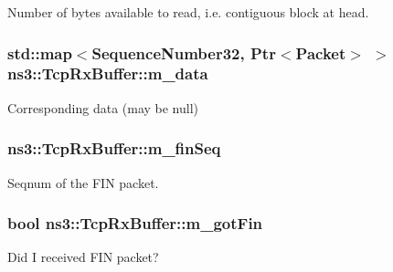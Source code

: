Number of bytes available to read, i.\+e. contiguous block at head. 

\subsubsection[{\texorpdfstring{m\+\_\+data}{m_data}}]{\setlength{\rightskip}{0pt plus 5cm}std\+::map$<${\bf Sequence\+Number32}, {\bf Ptr}$<${\bf Packet}$>$ $>$ ns3\+::\+Tcp\+Rx\+Buffer\+::m\+\_\+data\hspace{0.3cm}{\ttfamily [private]}}\hypertarget{classns3_1_1TcpRxBuffer_a695c34ebc7bd328b49c507f101257aed}{}\label{classns3_1_1TcpRxBuffer_a695c34ebc7bd328b49c507f101257aed}


Corresponding data (may be null) 

\subsubsection[{\texorpdfstring{m\+\_\+fin\+Seq}{m_finSeq}}]{ ns3\+::\+Tcp\+Rx\+Buffer\+::m\+\_\+fin\+Seq\hspace{0.3cm}{\ttfamily [private]}}\hypertarget{classns3_1_1TcpRxBuffer_a6f63b30eaef4dfcd219cbb9b31fc1a9d}{}\label{classns3_1_1TcpRxBuffer_a6f63b30eaef4dfcd219cbb9b31fc1a9d}


Seqnum of the F\+IN packet. 

\subsubsection[{\texorpdfstring{m\+\_\+got\+Fin}{m_gotFin}}]{\setlength{\rightskip}{0pt plus 5cm}bool ns3\+::\+Tcp\+Rx\+Buffer\+::m\+\_\+got\+Fin\hspace{0.3cm}{\ttfamily [private]}}\hypertarget{classns3_1_1TcpRxBuffer_ad87a9d034dcc4150cacb5ec45c1883ae}{}\label{classns3_1_1TcpRxBuffer_ad87a9d034dcc4150cacb5ec45c1883ae}


Did I received F\+IN packet? 

